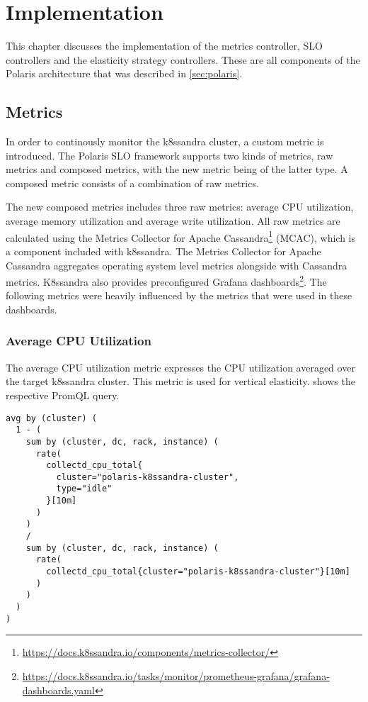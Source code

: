 \chapter{Implementation}
\label{ch:implementation}

This chapter discusses the implementation of the metrics controller, SLO controllers and the elasticity strategy controllers. These are all components of the Polaris architecture that was described in \cref{sec:polaris}.
\section{Metrics}
\label{sec:metrics}

In order to continously monitor the k8ssandra cluster, a custom metric is introduced. The Polaris SLO framework supports two kinds of metrics, raw metrics and composed metrics, with the new metric being of the latter type. A composed metric consists of a combination of raw metrics.

The new composed metrics includes three raw metrics: average CPU utilization, average memory utilization and average write utilization. All raw metrics are calculated using the Metrics Collector for Apache Cassandra\footnote{\url{https://docs.k8ssandra.io/components/metrics-collector/}} (MCAC), which is a component included with k8ssandra. The Metrics Collector for Apache Cassandra aggregates operating system level metrics alongside with Cassandra metrics. K8ssandra also provides preconfigured Grafana dashboards\footnote{\raggedright\url{https://docs.k8ssandra.io/tasks/monitor/prometheus-grafana/grafana-dashboards.yaml}}. The following metrics were heavily influenced by the metrics that were used in these dashboards.

\subsection{Average CPU Utilization}

The average CPU utilization metric expresses the CPU utilization averaged over the target k8ssandra cluster. This metric is used for vertical elasticity.  shows the respective PromQL query.

\begin{lstlisting}[caption={PromQL query used for the average CPU utilisation metric},
                    captionpos=b,
                    label=lst:avgCpuUtilization,
                    float]
avg by (cluster) (
  1 - (
    sum by (cluster, dc, rack, instance) (
      rate(
        collectd_cpu_total{
          cluster="polaris-k8ssandra-cluster",
          type="idle"
        }[10m]
      )
    )
    /
    sum by (cluster, dc, rack, instance) (
      rate(
        collectd_cpu_total{cluster="polaris-k8ssandra-cluster"}[10m]
      )
    )
  )
)
\end{lstlisting}

